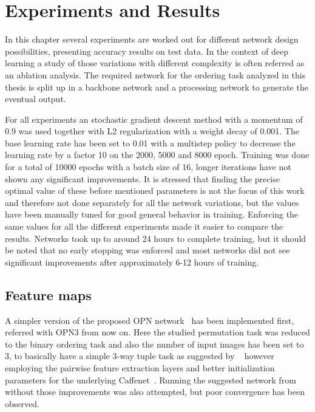 %
\newpage
\chapter{Experiments and Results}
\label{ch:experimentsandresults}
In this chapter several experiments are worked out for different network design possibilities, presenting accuracy results on test data. In the context of deep learning a study of those variations with different complexity is often referred as an ablation analysis. The required network for the ordering task analyzed in this thesis is split up in a backbone network and a processing network to generate the eventual output. 

For all experiments an stochastic gradient descent method with a momentum of 0.9 was used together with L2 regularization with a weight decay of 0.001. The base learning rate has been set to 0.01 with a multistep policy to decrease the learning rate by a factor 10 on the 2000, 5000 and 8000 epoch. Training was done for a total of 10000 epochs with a batch size of 16, longer iterations have not shown any significant improvements. It is stressed that finding the precise optimal value of these before mentioned parameters is not the focus of this work and therefore not done separately for all the network variations, but the values have been manually tuned for good general behavior in training. Enforcing the same values for all the different experiments made it easier to compare the results. Networks took up to around 24 hours to complete training, but it should be noted that no early stopping was enforced and most networks did not see significant improvements after approximately 6-12 hours of training.

\section{Feature maps}
A simpler version of the proposed OPN network~\cite{lee2017} has been implemented first, referred with OPN3 from now on. Here the studied permutation task was reduced to the binary ordering task and also the number of input images has been set to 3, to basically have a simple 3-way tuple task as suggested by ~\cite{misra2016} however employing the pairwise feature extraction layers and better initialization parameters for the underlying Caffenet~\cite{jia2014}. Running the suggested network from~\cite{misra2016} without those improvements was also attempted, but poor convergence has been observed. 

